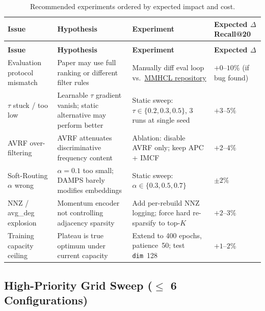 \documentclass[12pt,a4paper]{article}
\begin{document}
\begin{longtable}{|>{\raggedright\arraybackslash}p{2.5cm}|
                  >{\raggedright\arraybackslash}p{3.5cm}|
                  >{\raggedright\arraybackslash}p{4.0cm}|
                  >{\raggedright\arraybackslash}p{2.5cm}|}
\caption{Recommended experiments ordered by expected impact and cost.}
\label{tab:actions}\\
\hline
\rowcolor{tabhead}\textbf{Issue} & \textbf{Hypothesis} & \textbf{Experiment} & \textbf{Expected $\Delta$ Recall@20} \\
\hline
\endfirsthead
\multicolumn{4}{c}{\textit{(continued)}}\\
\hline
\rowcolor{tabhead}\textbf{Issue} & \textbf{Hypothesis} & \textbf{Experiment} & \textbf{Expected $\Delta$}\\
\hline
\endhead
\hline
\endfoot

Evaluation protocol mismatch
  & Paper may use full ranking or different filter rules
  & Manually diff eval loop vs.\
    \href{https://github.com/Xu107/MMHCL}{MMHCL repository}
  & $+0$--$10\%$ (if bug found) \\\hline

$\tau$ stuck / too low
  & Learnable $\tau$ gradient vanish; static alternative may perform better
  & Static sweep: $\tau \in \{0.2, 0.3, 0.5\}$, 3 runs at single seed
  & $+3$--$5\%$ \\\hline

AVRF over-filtering
  & AVRF attenuates discriminative frequency content
  & Ablation: disable AVRF only; keep APC + IMCF
  & $+2$--$4\%$ \\\hline

Soft-Routing $\alpha$ wrong
  & $\alpha = 0.1$ too small; DAMPS barely modifies embeddings
  & Static sweep: $\alpha \in \{0.3, 0.5, 0.7\}$
  & $\pm 2\%$ \\\hline

NNZ / avg\_deg explosion
  & Momentum encoder not controlling adjacency sparsity
  & Add per-rebuild NNZ logging; force hard re-sparsify to top-$K$
  & $+2$--$3\%$ \\\hline

Training capacity ceiling
  & Plateau is true optimum under current capacity
  & Extend to 400 epochs, patience~50; test \texttt{dim}~128
  & $+1$--$2\%$ \\\hline

\end{longtable}

\subsection{High-Priority Grid Sweep (\texorpdfstring{$\leq$}{<=} 6 Configurations)}
\end{document}
